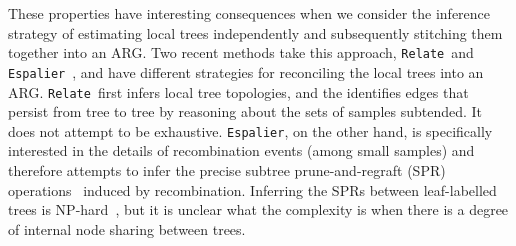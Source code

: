\documentclass{article}
\newcommand{\relate}[0]{\texttt{Relate}}
\newcommand{\espalier}[0]{\texttt{Espalier}}
\begin{document}
These properties have interesting consequences when we
consider the inference strategy of estimating local trees
independently and subsequently stitching them together
into an ARG.
Two recent methods take this approach,
\relate\ and
\espalier~\citep{rasmussen2022espalier},
and have different strategies for reconciling the local trees into an ARG.
\relate\ first infers local tree topologies, and the identifies
edges that persist from tree to tree by reasoning about the sets of samples
subtended. It does not attempt to be exhaustive.
\espalier, on the other hand, is specifically interested
in the details of recombination events (among small samples)
and therefore attempts to infer
the precise subtree prune-and-regraft (SPR)
operations~\citep{hein1990reconstructing,song2003on,song2006properties}
induced by recombination.
Inferring the SPRs between leaf-labelled trees is
NP-hard~\citep{hein1996complexity,allen2001subtree,bordewich2005computational},
but it is unclear what the complexity is when there
is a degree of internal node sharing between trees.


\end{document}
